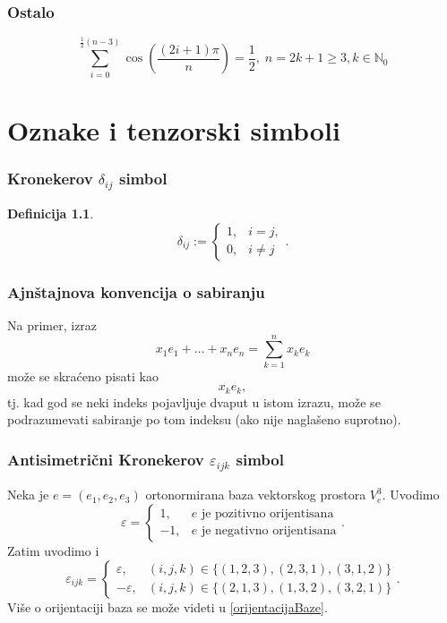 \documentclass[a4paper,12pt,twoside]{report}
\newtheorem{definition}{Definicija}[section]
\numberwithin{algorithm}{section}
\begin{document}
\subsection{Ostalo}
\[
 \sum_{i=0}^{\frac{1}{2}{(n-3)}}\cos\left(\frac{\left(2i+1\right)\pi}{n}\right) = \frac{1}{2},\;n=2k+1\geq3, k \in \mathbb{N}_0
\]

\newpage

\chapter{Oznake i tenzorski simboli}
\subsection{Kronekerov $\delta_{ij}$ simbol}
\begin{definition}
    \[ \delta_{ij} := \begin{cases}
        1, & i = j,\\
        0, & i \neq j
    \end{cases}. \]
\end{definition}
\subsection{Ajnštajnova konvencija o sabiranju}
Na primer, izraz \[ x_1e_1 + \dots + x_ne_n = \sum_{k=1}^{n} x_ke_k\]
može se skraćeno pisati kao 
\[ x_ke_k, \] tj. kad god se neki indeks pojavljuje dvaput u istom izrazu, može se podrazumevati sabiranje po tom indeksu (ako nije naglašeno suprotno).
\subsection{Antisimetrični Kronekerov $\varepsilon_{ijk}$ simbol}
Neka je $e = (e_1, e_2, e_3)$ ortonormirana baza vektorskog prostora $V_e^3$. Uvodimo 
\[ \varepsilon = \begin{cases}
    1, & e \text{ je pozitivno orijentisana}\\
    -1, & e \text{ je negativno orijentisana}
\end{cases}. \]
Zatim uvodimo i 
\[ \varepsilon_{ijk} = \begin{cases}
    \varepsilon, & (i, j, k) \in \{(1, 2, 3), (2, 3, 1), (3, 1, 2)\}\\
    -\varepsilon, & (i, j, k) \in \{ (2, 1, 3), (1, 3, 2), (3, 2, 1) \}
\end{cases}. \]
Više o orijentaciji baza se može videti u \ref{orijentacijaBaze}.
  
\end{document}
